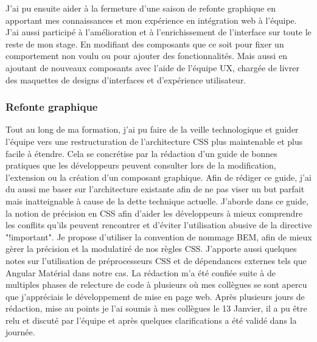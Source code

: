 \documentclass[12pt, a4paper]{report}
\newcommand\tab[1][1cm]{\hspace*{#1}}
\begin{document}
J'ai pu ensuite aider à la fermeture d'une saison de refonte graphique en apportant mes connaissances et mon expérience en intégration web à l'équipe.\newline
J'ai aussi participé à l'amélioration et à l'enrichissement de l'interface sur toute le reste de mon stage. En modifiant des composants que ce soit pour fixer un comportement non voulu ou pour ajouter des fonctionnalités. Mais aussi en ajoutant de nouveaux composants avec l'aide de l'équipe UX, chargée de livrer des maquettes de designs d'interfaces et d'expérience utilisateur.\newline

\subsubsection{Refonte graphique}
\tab{}Tout au long de ma formation, j'ai pu faire de la veille technologique et guider l'équipe vers une restructuration de l'architecture CSS plus maintenable et plus facile à étendre.\newline
Cela se concrétise par la rédaction d'un guide de bonnes pratiques que les développeurs peuvent consulter lors de la modification, l'extension ou la création d'un composant graphique.
Afin de rédiger ce guide, j'ai du aussi me baser sur l'architecture existante afin de ne pas viser un but parfait mais inatteignable à cause de la dette technique actuelle.\newline
J'aborde dans ce guide, la notion de précision en CSS afin d'aider les développeurs à mieux comprendre les conflits qu'ils peuvent rencontrer et d'éviter l'utilisation abusive de la directive "!important". Je propose d'utiliser la convention de nommage BEM, afin de mieux gèrer la précision et la modulatiré de nos règles CSS. J'apporte aussi quelques notes sur l'utilisation de préprocesseurs CSS et de dépendances externes tels que Angular Matérial dans notre cas.\newline
La rédaction m'a été confiée suite à de multiples phases de relecture de code à plusieurs où mes collègues se sont apercu que j'appréciais le développement de mise en page web. Après plusieurs jours de rédaction, mise au points je l'ai soumis à mes collègues le 13 Janvier, il a pu être relu et discuté par l'équipe et après quelques clarifications a été validé dans la journée.\newline
\end{document}
